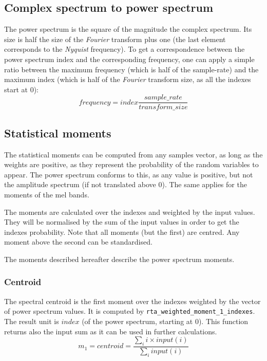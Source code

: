\documentclass[a4paper, twoside]{article}
\begin{document}
\subsection{Complex spectrum to power spectrum }
\label{sec:power_spectrum}

The power spectrum is the square of the magnitude the complex
spectrum.
Its size is half the size of the \textit{Fourier} transform plus one
(the last element corresponds to the \textit{Nyquist} frequency). To
get a correspondence between the power spectrum index and the
corresponding frequency, one can apply a simple ratio between the
maximum frequency (which is half of the sample-rate) and the maximum
index (which is half of the \textit{Fourier} transform size, as all
the indexes start at 0):
$$ frequency = index \frac{sample\_rate}{transform\_size}$$

\subsection{Statistical moments}
\label{sec:moments}

The statistical moments can be computed from any samples vector, as
long as the weights are positive, as they represent the probability of
the random variables to appear. The power spectrum conforms to this, as
any value is positive, but not the amplitude spectrum (if not
translated above 0). The same applies for the moments of the mel
bands.

The moments are calculated over the indexes and weighted by the input
values. They will be normalised by the sum of the input values in order
to get the indexes probability. Note that all moments (but the first)
are centred. Any moment above the second can be standardised. 

The moments described hereafter describe the power spectrum moments.

\subsubsection{Centroid}
\label{sec:centroid}

The spectral centroid is the first moment over the indexes weighted by
the vector of power spectrum values. It is computed by
\texttt{rta\_weighted\_moment\_1\_indexes}. The result unit is
$index$ (of the power spectrum, starting at 0). This function
returns also the input sum as it can be used in further calculations.
$$ m_1 = centroid = \frac {\sum_i i \times input(i)}
{\sum_i input(i)} $$
\end{document}
